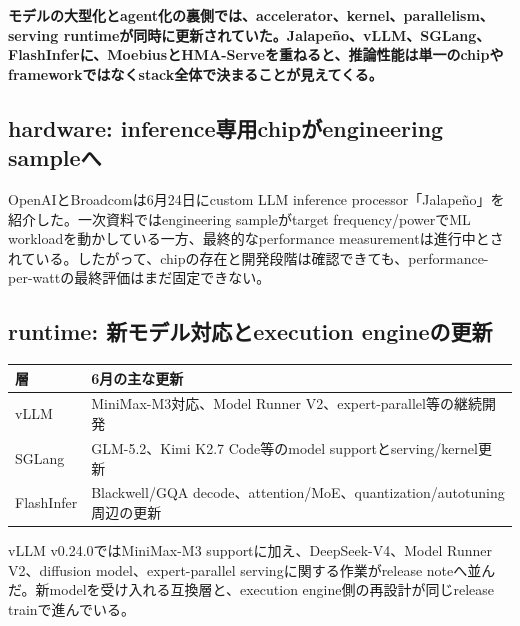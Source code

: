 \noindent\textbf{モデルの大型化とagent化の裏側では、accelerator、kernel、parallelism、serving runtimeが同時に更新されていた。Jalapeño、vLLM、SGLang、FlashInferに、MoebiusとHMA-Serveを重ねると、推論性能は単一のchipやframeworkではなくstack全体で決まることが見えてくる。}\autocite{src-272a6dac5bcc,src-43606e2afafd,src-538cecdad845,src-6cc910fb0183,src-855db08b75f6,src-a66d76643eee}

\subsection{hardware: inference専用chipがengineering sampleへ}

OpenAIとBroadcomは6月24日にcustom LLM inference processor「Jalapeño」を紹介した。一次資料ではengineering sampleがtarget frequency/powerでML workloadを動かしている一方、最終的なperformance measurementは進行中とされている。したがって、chipの存在と開発段階は確認できても、performance-per-wattの最終評価はまだ固定できない。\autocite{src-855db08b75f6}


\subsection{runtime: 新モデル対応とexecution engineの更新}

\begin{center}
\small
\begin{tabularx}{\columnwidth}{>{\raggedright\arraybackslash}X|>{\raggedright\arraybackslash}X}
\toprule
\textbf{層} & \textbf{6月の主な更新} \\
\midrule
vLLM & MiniMax-M3対応、Model Runner V2、expert-parallel等の継続開発 \\
SGLang & GLM-5.2、Kimi K2.7 Code等のmodel supportとserving/kernel更新 \\
FlashInfer & Blackwell/GQA decode、attention/MoE、quantization/autotuning周辺の更新 \\
\bottomrule
\end{tabularx}
\autocite{src-272a6dac5bcc,src-538cecdad845,src-6cc910fb0183}
\end{center}

vLLM v0.24.0ではMiniMax-M3 supportに加え、DeepSeek-V4、Model Runner V2、diffusion model、expert-parallel servingに関する作業がrelease noteへ並んだ。新modelを受け入れる互換層と、execution engine側の再設計が同じrelease trainで進んでいる。\autocite{src-6cc910fb0183}


